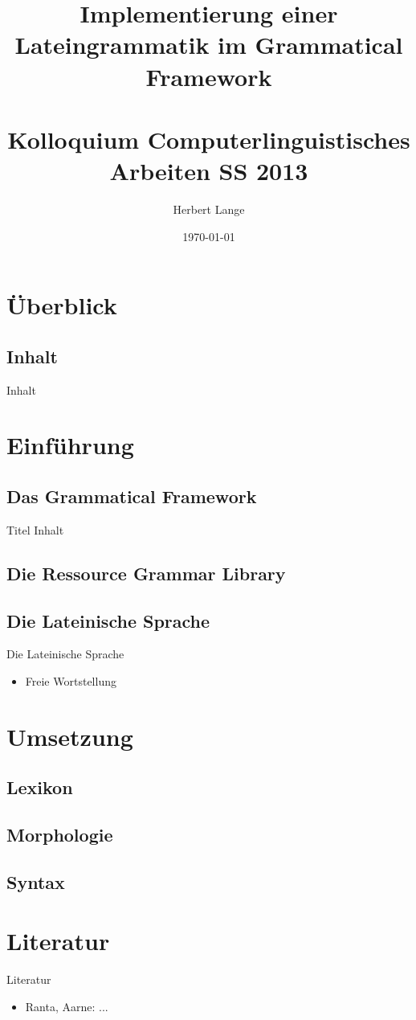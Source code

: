 \documentclass{beamer}
\title{Implementierung einer Lateingrammatik im Grammatical Framework \\ \quad \\ \large Kolloquium Computerlinguistisches Arbeiten SS 2013 }
\author{Herbert Lange}
\date{\today}
\begin{document}
\frame{\titlepage}

\section*{Überblick}
\subsection*{Inhalt}
\begin{frame}{Inhalt}
\tableofcontents
\end{frame}
\section{Einführung}
\subsection{Das Grammatical Framework}
\begin{frame}[fragile]{Titel}
Inhalt
\end{frame}
\subsection{Die Ressource Grammar Library}
\subsection{Die Lateinische Sprache}
\begin{frame}[fragile]{Die Lateinische Sprache}
\begin{itemize}
\item Freie Wortstellung
\end{itemize}
\end{frame}
\section{Umsetzung}
\subsection{Lexikon}
\subsection{Morphologie}
\subsection{Syntax}
\section{Literatur}
\begin{frame}{Literatur}
\begin{itemize}
\item Ranta, Aarne: ... \\
\end{itemize}
\end{frame}
\end{document}
